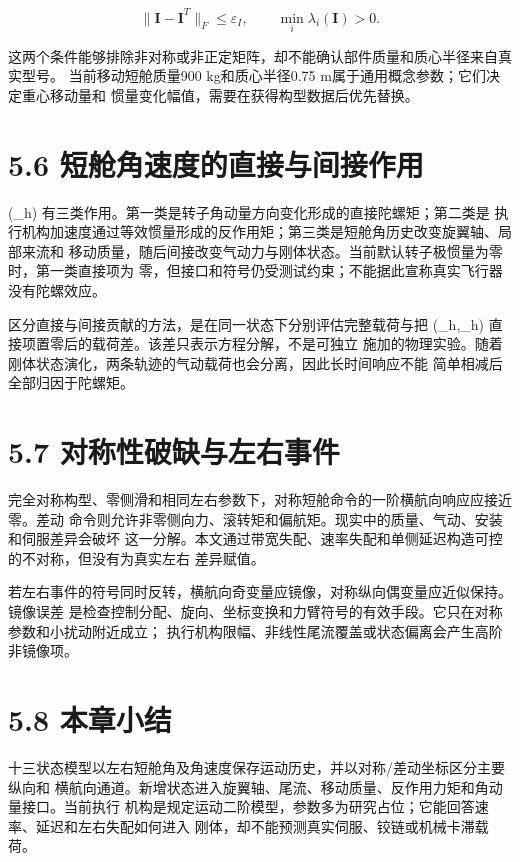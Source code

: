 \documentclass[UTF8,11pt,oneside,openany,fontset=windows]{ctexbook}
\begin{document}
\[
\|\mathbf I-\mathbf I^T\|_F\le\varepsilon_I,\qquad
\min_i\lambda_i(\mathbf I)>0.
\]

这两个条件能够排除非对称或非正定矩阵，却不能确认部件质量和质心半径来自真实型号。
当前移动短舱质量900 kg和质心半径0.75
m属于通用概念参数；它们决定重心移动量和
惯量变化幅值，需要在获得构型数据后优先替换。

\section{5.6
短舱角速度的直接与间接作用}\label{ux77edux8231ux89d2ux901fux5ea6ux7684ux76f4ux63a5ux4e0eux95f4ux63a5ux4f5cux7528}

(\dot\beta\_h)
有三类作用。第一类是转子角动量方向变化形成的直接陀螺矩；第二类是
执行机构加速度通过等效惯量形成的反作用矩；第三类是短舱角历史改变旋翼轴、局部来流和
移动质量，随后间接改变气动力与刚体状态。当前默认转子极惯量为零时，第一类直接项为
零，但接口和符号仍受测试约束；不能据此宣称真实飞行器没有陀螺效应。

区分直接与间接贡献的方法，是在同一状态下分别评估完整载荷与把
(\dot\beta\_h,\ddot\beta\_h)
直接项置零后的载荷差。该差只表示方程分解，不是可独立
施加的物理实验。随着刚体状态演化，两条轨迹的气动载荷也会分离，因此长时间响应不能
简单相减后全部归因于陀螺矩。

\section{5.7
对称性破缺与左右事件}\label{ux5bf9ux79f0ux6027ux7834ux7f3aux4e0eux5de6ux53f3ux4e8bux4ef6}

完全对称构型、零侧滑和相同左右参数下，对称短舱命令的一阶横航向响应应接近零。差动
命令则允许非零侧向力、滚转矩和偏航矩。现实中的质量、气动、安装和伺服差异会破坏
这一分解。本文通过带宽失配、速率失配和单侧延迟构造可控的不对称，但没有为真实左右
差异赋值。

若左右事件的符号同时反转，横航向奇变量应镜像，对称纵向偶变量应近似保持。镜像误差
是检查控制分配、旋向、坐标变换和力臂符号的有效手段。它只在对称参数和小扰动附近成立；
执行机构限幅、非线性尾流覆盖或状态偏离会产生高阶非镜像项。

\section{5.8 本章小结}\label{ux672cux7ae0ux5c0fux7ed3-3}

十三状态模型以左右短舱角及角速度保存运动历史，并以对称/差动坐标区分主要纵向和
横航向通道。新增状态进入旋翼轴、尾流、移动质量、反作用力矩和角动量接口。当前执行
机构是规定运动二阶模型，参数多为研究占位；它能回答速率、延迟和左右失配如何进入
刚体，却不能预测真实伺服、铰链或机械卡滞载荷。
\end{document}
